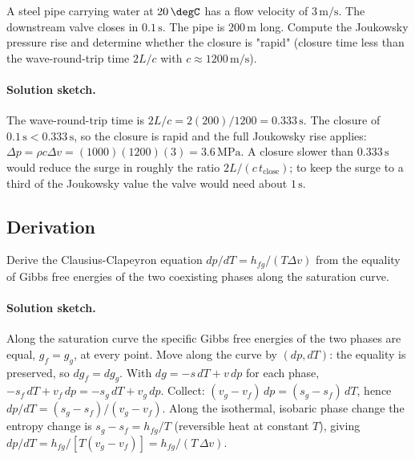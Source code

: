 \begin{exercise}
A steel pipe carrying water at $20\,\degC$ has a flow velocity of
$3\,\text{m}/\text{s}$. The downstream valve closes in $0.1\,\text{s}$.
The pipe is $200\,\text{m}$ long. Compute the Joukowsky pressure rise
and determine whether the closure is "rapid" (closure time less than
the wave-round-trip time $2L/c$ with $c \approx 1200\,\text{m}/
\text{s}$).

\paragraph{Solution sketch.} The wave-round-trip time is $2L/c =
2(200)/1200 = 0.333\,\text{s}$. The closure of $0.1\,\text{s} < 0.333\,
\text{s}$, so the closure is rapid and the full Joukowsky rise applies:
$\Delta p = \rho c \Delta v = (1000)(1200)(3) = 3.6\,\text{MPa}$. A
closure slower than $0.333\,\text{s}$ would reduce the surge in roughly
the ratio $2L/(c\,t_{\text{close}})$; to keep the surge to a third of the
Joukowsky value the valve would need about $1\,\text{s}$.
\end{exercise}

\subsection*{Derivation}

\begin{exercise}
Derive the Clausius-Clapeyron equation $dp/dT = h_{fg}/(T \Delta v)$
from the equality of Gibbs free energies of the two coexisting
phases along the saturation curve.

\paragraph{Solution sketch.} Along the saturation curve the specific
Gibbs free energies of the two phases are equal, $g_f = g_g$, at every
point. Move along the curve by $(dp, dT)$: the equality is preserved, so
$dg_f = dg_g$. With $dg = -s\,dT + v\,dp$ for each phase, $-s_f\,dT +
v_f\,dp = -s_g\,dT + v_g\,dp$. Collect: $(v_g - v_f)\,dp = (s_g -
s_f)\,dT$, hence $dp/dT = (s_g - s_f)/(v_g - v_f)$. Along the isothermal,
isobaric phase change the entropy change is $s_g - s_f = h_{fg}/T$
(reversible heat at constant $T$), giving $dp/dT = h_{fg}/[T(v_g - v_f)] =
h_{fg}/(T\,\Delta v)$.
\end{exercise}

